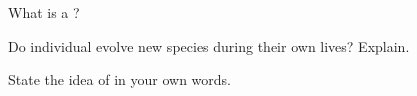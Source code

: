 \begin{exercise}[$\star$]\label{exo:g5:evolution:3}
What is a ?
\end{exercise}

\begin{exercise}[$\star$]\label{exo:g5:evolution:4}
Do individual  evolve new species during their own lives?
Explain.
\end{exercise}

\begin{exercise}[$\star\star$]\label{exo:g5:evolution:5}
State the idea of  in your own words.
\end{exercise}

